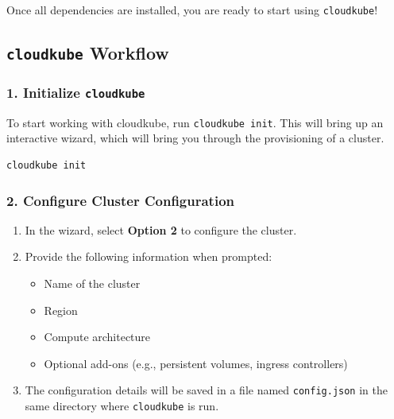 Once all dependencies are installed, you are ready to start using \texttt{cloudkube}!

\subsection*{\texttt{cloudkube} Workflow}

\subsubsection*{1. Initialize \texttt{cloudkube}}
To start working with cloudkube, run \texttt{cloudkube init}. This will bring up an interactive wizard, which will bring you through the provisioning of a cluster. 
\begin{lstlisting}[xleftmargin=10pt]
cloudkube init
\end{lstlisting}


\subsubsection*{2. Configure Cluster Configuration}
\begin{enumerate}[label=\alph*.]
    \item In the wizard, select \textbf{Option 2} to configure the cluster.
    \item Provide the following information when prompted:
          \begin{itemize}
              \item Name of the cluster
              \item Region
              \item Compute architecture
              \item Optional add-ons (e.g., persistent volumes, ingress controllers)
          \end{itemize}
    \item The configuration details will be saved in a file named \texttt{config.json} in the same directory where \texttt{cloudkube} is run.
\end{enumerate}

